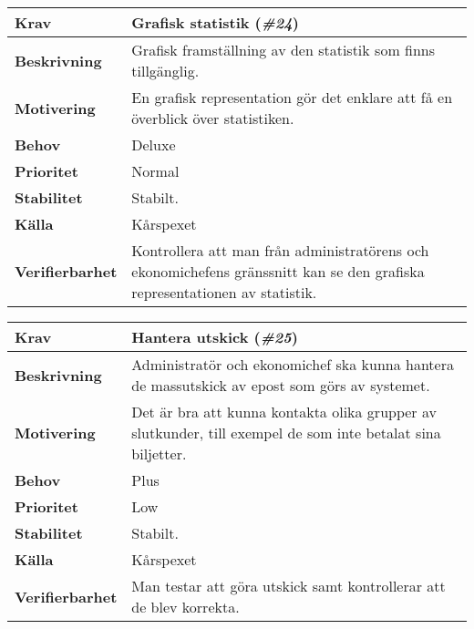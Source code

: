 \documentclass[a4paper, twoside, 11pt, titlepage]{article}
\begin{document}
		\begin{tabular} { p{2.6cm} p{12.5cm} }
			\hline
			\sffamily\textbf{Krav} & Grafisk statistik (\emph{\#24})  \\
			\hline
			\sffamily\textbf{Beskrivning} & Grafisk framställning av den statistik som finns tillgänglig.  \\
			\hline
			\sffamily\textbf{Motivering} & En grafisk representation gör det enklare att få en överblick över statistiken.  \\
			\hline
			\sffamily\textbf{Behov} & Deluxe  \\
			\hline
			\sffamily\textbf{Prioritet} & Normal  \\
			\hline
			\sffamily\textbf{Stabilitet} & Stabilt.  \\
			\hline
			\sffamily\textbf{Källa} & Kårspexet  \\
			\hline
			\sffamily\textbf{Verifierbarhet} & Kontrollera att man från administratörens och ekonomichefens gränssnitt kan se den grafiska representationen av statistik.  \\
			\hline
		\end{tabular}
		\vspace{6mm}

		\begin{tabular} { p{2.6cm} p{12.5cm} }
			\hline
			\sffamily\textbf{Krav} & Hantera utskick (\emph{\#25})  \\
			\hline
			\sffamily\textbf{Beskrivning} & Administratör och ekonomichef ska kunna hantera de massutskick av epost som görs av systemet.  \\
			\hline
			\sffamily\textbf{Motivering} & Det är bra att kunna kontakta olika grupper av slutkunder, till exempel de som inte betalat sina biljetter.  \\
			\hline
			\sffamily\textbf{Behov} & Plus  \\
			\hline
			\sffamily\textbf{Prioritet} & Low  \\
			\hline
			\sffamily\textbf{Stabilitet} & Stabilt.  \\
			\hline
			\sffamily\textbf{Källa} & Kårspexet  \\
			\hline
			\sffamily\textbf{Verifierbarhet} & Man testar att göra utskick samt kontrollerar att de blev korrekta.   \\
			\hline
		\end{tabular}
		\vspace{6mm}
\end{document}
